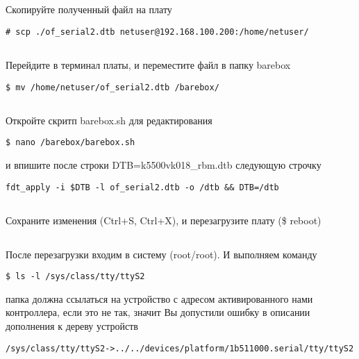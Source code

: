 \subsection{}Скопируйте полученный файл на плату
\begin{lstlisting}[style=bash]
# scp ./of_serial2.dtb netuser@192.168.100.200:/home/netuser/
\end{lstlisting}

\subsection{}Перейдите в терминал платы, и переместите файл в папку barebox
\begin{lstlisting}[style=bash]
$ mv /home/netuser/of_serial2.dtb /barebox/
\end{lstlisting}

\subsection{}Откройте скритп barebox.sh для редактирования
\begin{lstlisting}[style=bash]
$ nano /barebox/barebox.sh
\end{lstlisting}
и впишите после строки DTB=k5500vk018\_rbm.dtb следующую строчку
\begin{lstlisting}[style=stdout]
fdt_apply -i $DTB -l of_serial2.dtb -o /dtb && DTB=/dtb
\end{lstlisting}

\subsection{}Сохраните изменения (Ctrl+S, Ctrl+X), и перезагрузите плату (\$ reboot)

\subsection{}После перезагрузки входим в систему (root/root). И выполняем команду
\begin{lstlisting}[style=bash]
$ ls -l /sys/class/tty/ttyS2
\end{lstlisting}
папка должна ссылаться на устройство с адресом активированного нами контроллера, если это не так, значит Вы допустили ошибку в описании дополнения к дереву устройств
\begin{lstlisting}[style=stdout]
/sys/class/tty/ttyS2->../../devices/platform/1b511000.serial/tty/ttyS2
\end{lstlisting}

